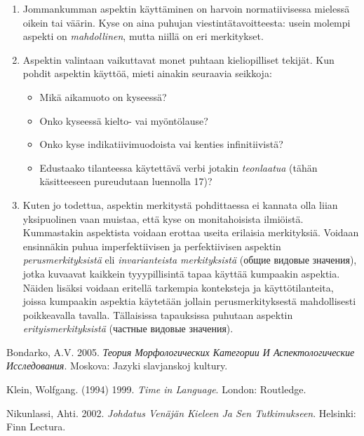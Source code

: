 \documentclass[]{scrartcl}
\providecommand{\tightlist}{%
  \setlength{\itemsep}{0pt}\setlength{\parskip}{0pt}}
\begin{document}
\begin{enumerate}
\def\labelenumi{\arabic{enumi}.}
\tightlist
\item
  Jommankumman aspektin käyttäminen on harvoin normatiivisessa mielessä
  oikein tai väärin. Kyse on aina puhujan viestintätavoitteesta: usein
  molempi aspekti on \emph{mahdollinen}, mutta niillä on eri
  merkitykset.
\item
  Aspektin valintaan vaikuttavat monet puhtaan kieliopilliset tekijät.
  Kun pohdit aspektin käyttöä, mieti ainakin seuraavia seikkoja:

  \begin{itemize}
  \tightlist
  \item
    Mikä aikamuoto on kyseessä?
  \item
    Onko kyseessä kielto- vai myöntölause?
  \item
    Onko kyse indikatiivimuodoista vai kenties infinitiivistä?
  \item
    Edustaako tilanteessa käytettävä verbi jotakin \emph{teonlaatua}
    (tähän käsitteeseen pureudutaan luennolla 17)?
  \end{itemize}
\item
  Kuten jo todettua, aspektin merkitystä pohdittaessa ei kannata olla
  liian yksipuolinen vaan muistaa, että kyse on monitahoisista
  ilmiöistä. Kummastakin aspektista voidaan erottaa useita erilaisia
  merkityksiä. Voidaan ensinnäkin puhua imperfektiivisen ja
  perfektiivisen aspektin \emph{perusmerkityksistä} eli
  \emph{invarianteista merkityksistä} (общие видовые значения), jotka
  kuvaavat kaikkein tyyypillisintä tapaa käyttää kumpaakin aspektia.
  Näiden lisäksi voidaan eritellä tarkempia konteksteja ja
  käyttötilanteita, joissa kumpaakin aspektia käytetään jollain
  perusmerkityksestä mahdollisesti poikkeavalla tavalla. Tällaisissa
  tapauksissa puhutaan aspektin \emph{erityismerkityksistä} (частные
  видовые значения).
\end{enumerate}

Bondarko, A.V. 2005. \emph{Теория Морфологических Категории И
Аспектологические Исследования}. Moskova: Jazyki slavjanskoj kultury.

Klein, Wolfgang. (1994) 1999. \emph{Time in Language}. London:
Routledge.

Nikunlassi, Ahti. 2002. \emph{Johdatus Venäjän Kieleen Ja Sen
Tutkimukseen}. Helsinki: Finn Lectura.
\end{document}
